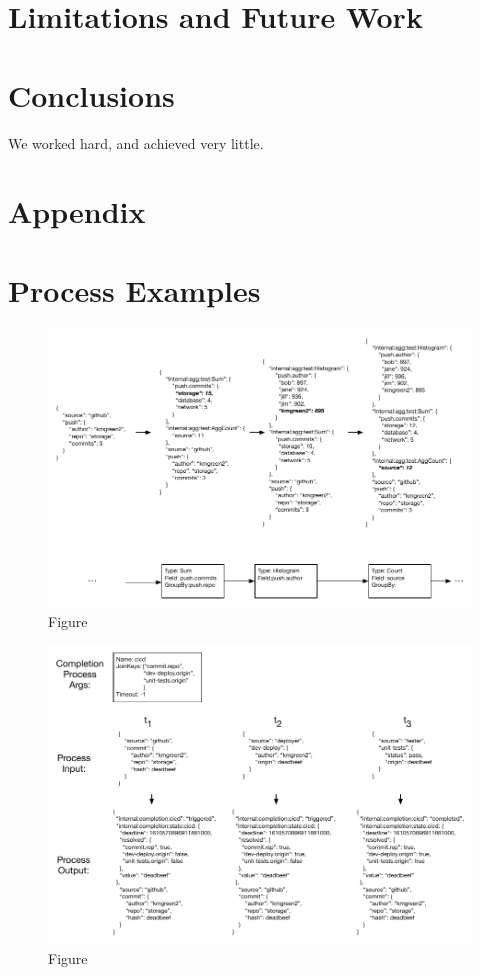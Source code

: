 \documentclass[10pt,twocolumn]{article}
\begin{document}
\section{Limitations and Future Work}\label{future:work}
\section{Conclusions}\label{conclusions}
We worked hard, and achieved very little.




\section{Appendix}\label{sec:appendix}
\section{Process Examples}\label{sec:appendix:process}

\begin{figure}
\centering
\includegraphics{figures/aggregation.pdf}
\caption{Figure}
\label{fig:aggregation}
\end{figure}


\begin{figure}
\centering
\includegraphics{figures/completion.pdf}
\caption{Figure}
\label{fig:completion}
\end{figure}
\end{document}
